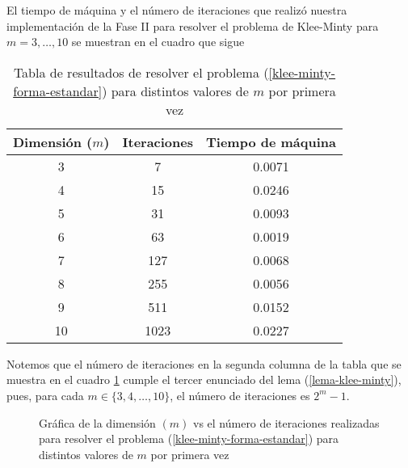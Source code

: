 \documentclass[titlepage]{article}
\begin{document}
El tiempo de máquina y el número de iteraciones que realizó nuestra implementación de la Fase II para resolver el problema de Klee-Minty para $m = 3, \dots, 10$ se muestran en el cuadro que sigue

\begin{table}[ht]
    \begin{center}
        \begin{tabular}{|c|c|c|}
            \hline
            \rowcolor[HTML]{C0C0C0} 
            Dimensión ($m$) & Iteraciones    & Tiempo de máquina\\ \hline
            3               & 7              & 0.0071           \\ \hline
            4               & 15             & 0.0246           \\ \hline
            5               & 31             & 0.0093           \\ \hline
            6               & 63             & 0.0019           \\ \hline
            7               & 127            & 0.0068           \\ \hline
            8               & 255            & 0.0056           \\ \hline
            9               & 511            & 0.0152           \\ \hline
            10              & 1023           & 0.0227           \\ \hline
        \end{tabular}
        \caption{Tabla de resultados de resolver el problema (\ref{klee-minty-forma-estandar}) para distintos valores de $m$ por primera vez}
        \label{tabla-resultados-klee-minty}
    \end{center}
\end{table}

\newpage

Notemos que el número de iteraciones en la segunda columna de la tabla que se muestra en el cuadro \ref{tabla-resultados-klee-minty}  cumple el tercer enunciado del lema (\ref{lema-klee-minty}), pues, para cada $m \in \{3,4,\dots, 10\}$, el número de iteraciones es $2^m-1$.

\begin{figure}[ht]
    \centering
    
    \caption{Gráfica de la dimensión $(m)$ vs el número de iteraciones realizadas para resolver el problema (\ref{klee-minty-forma-estandar}) para distintos valores de $m$ por primera vez}
    \label{Fig: grafica-resultados-klee-minty}
\end{figure}
\end{document}
